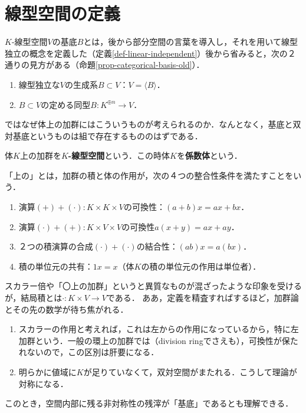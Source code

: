 \documentclass[uplatex, dvipdfmx]{jsreport}
\begin{document}
\section{線型空間の定義}

\begin{tcolorbox}[colframe=ForestGreen, colback=ForestGreen!10!white, breakable]
    $K$-線型空間$V$の基底$B$とは，後から部分空間の言葉を導入し，それを用いて線型独立の概念を定義した（定義\ref{def-linear-independent}）後から省みると，次の２通りの見方がある（命題\ref{prop-categorical-basis-old}）．
    \begin{enumerate}
        \item 線型独立な$V$の生成系$B\subset V$：$V=\langle B\rangle$．
        \item $B\subset V$の定める同型$B:K^{\oplus n}\to V$．
    \end{enumerate}
    ではなぜ体上の加群にはこういうものが考えられるのか．なんとなく，基底と双対基底というものは組で存在するもののはずである．
\end{tcolorbox}

\begin{definition}
    体$K$上の加群を\textbf{$K$-線型空間}という．この時体$K$を\textbf{係数体}という．

    「上の」とは，加群の積と体の作用が，次の４つの整合性条件を満たすことをいう．
    \begin{enumerate}
        \item 演算$(+)+(\cdot):K\times K\times V$の可換性：$(a+b)x=ax+bx$．
        \item 演算$(\cdot)+(+):K\times V\times V$の可換性$a(x+y)=ax+ay$．
        \item ２つの積演算の合成$(\cdot)+(\cdot)$の結合性：$(ab)x=a(bx)$．
        \item 積の単位元の共有：$1x=x$（体$K$の積の単位元の作用は単位者）．
    \end{enumerate}
\end{definition}
\begin{remark}[線型空間の定義の非対称性]
    スカラー倍や「〇上の加群」というと異質なものが混ざったような印象を受けるが，結局積とは$\cdot:K\times V\to V$である．
    ああ，定義を精査すればするほど，加群論とその先の数学が待ち焦がれる．
    \begin{enumerate}
        \item スカラーの作用と考えれば，これは左からの作用になっているから，特に左加群という．一般の環上の加群では（division ringでさえも），可換性が保たれないので，この区別は肝要になる．
        \item 明らかに値域に$K$が足りていなくて，双対空間がまたれる．こうして理論が対称になる．
    \end{enumerate}
    このとき，空間内部に残る非対称性の残滓が「基底」であるとも理解できる．
\end{remark}
\end{document}
